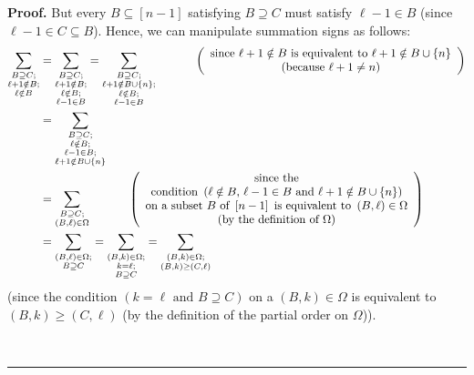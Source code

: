 \documentclass[numbers=enddot,12pt,final,onecolumn,notitlepage]{scrartcl}%
\theoremstyle{definition}
\newenvironment{proof}[1][Proof]{\noindent\textbf{#1.} }{\ \rule{0.5em}{0.5em}}
\let\sumnonlimits\sum
\renewcommand{\sum}{\sumnonlimits\limits}
\begin{document}
\begin{proof}
But every $B\subseteq\left[  n-1\right]  $ satisfying $B\supseteq C$ must
satisfy $\ell-1\in B$ (since $\ell-1\in C\subseteq B$). Hence, we can
manipulate summation signs as follows:%
\begin{align}
\sum_{\substack{B\supseteq C;\\\ell+1\notin B;\\\ell\notin B}}  &
=\sum_{\substack{B\supseteq C;\\\ell+1\notin B;\\\ell\notin B;\\\ell-1\in
B}}=\sum_{\substack{B\supseteq C;\\\ell+1\notin B\cup\left\{  n\right\}
;\\\ell\notin B;\\\ell-1\in B}}\ \ \ \ \ \ \ \ \ \ \left(
\begin{array}
[c]{c}%
\text{since }\ell+1\notin B\text{ is equivalent to }\ell+1\notin B\cup\left\{
n\right\} \\
\text{(because }\ell+1\neq n\text{)}%
\end{array}
\right) \nonumber\\
&  =\sum_{\substack{B\supseteq C;\\\ell\notin B;\\\ell-1\in B;\\\ell+1\notin
B\cup\left\{  n\right\}  }}\nonumber\\
&  =\sum_{\substack{B\supseteq C;\\\left(  B,\ell\right)  \in\Omega
}}\ \ \ \ \ \ \ \ \ \ \left(
\begin{array}
[c]{c}%
\text{since the}\\
\text{condition }\left(  \ell\notin B\text{, }\ell-1\in B\text{ and }%
\ell+1\notin B\cup\left\{  n\right\}  \right) \\
\text{on a subset }B\text{ of }\left[  n-1\right]  \text{ is equivalent to
}\left(  B,\ell\right)  \in\Omega\\
\text{(by the definition of }\Omega\text{)}%
\end{array}
\right) \nonumber\\
&  =\sum_{\substack{\left(  B,\ell\right)  \in\Omega;\\B\supseteq C}%
}=\sum_{\substack{\left(  B,k\right)  \in\Omega;\\k=\ell;\\B\supseteq C}%
}=\sum_{\substack{\left(  B,k\right)  \in\Omega;\\\left(  B,k\right)
\geq\left(  C,\ell\right)  }} \label{pf.prop.K.Epk.M.sum-man}%
\end{align}
(since the condition $\left(  k=\ell\text{ and }B\supseteq C\right)  $ on a
$\left(  B,k\right)  \in\Omega$ is equivalent to $\left(  B,k\right)
\geq\left(  C,\ell\right)  $ (by the definition of the partial order on
$\Omega$)).


\end{proof}
\end{document}
